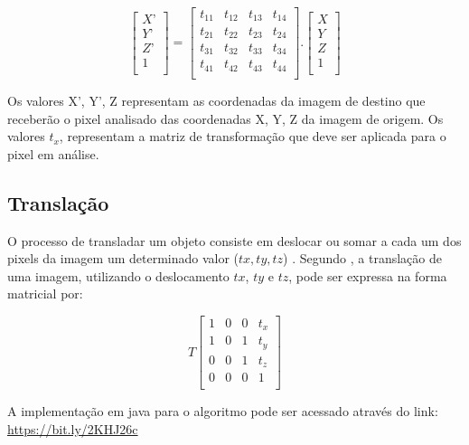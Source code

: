\documentclass[
	12pt,				%
	oneside,			%
	a4paper,			%
	english,			%
	french,				%
	spanish,			%
	brazil,				%
	]{abntex2}
\begin{document}
\[
\begin{bmatrix}
    X’       \\ 
	Y’       \\ 
	Z’       \\ 
    1        \\ 
\end{bmatrix}
=
\begin{bmatrix}
    t_{11} & t_{12} & t_{13} & t_{14}   \\ 
	t_{21} & t_{22} & t_{23} & t_{24}   \\ 
	t_{31} & t_{32} & t_{33} & t_{34}   \\ 
	t_{41} & t_{42} & t_{43} & t_{44}   \\ 
\end{bmatrix}
.
\begin{bmatrix}
    X       \\ 
	Y       \\ 
	Z       \\ 
    1       \\ 
\end{bmatrix}
\]

Os valores X’, Y’, Z representam as coordenadas da imagem de destino que receberão o pixel analisado das coordenadas X, Y, Z da imagem de origem. Os valores \(t_x\), representam a matriz de transformação que deve ser aplicada para o pixel em análise.

\subsection{Translação}

O processo de transladar um objeto consiste em deslocar ou somar a cada um dos pixels da imagem um determinado valor (\(tx, ty, tz\)) \cite{conciAzevedoLeta:2008}. Segundo \citet{pedriniSchwartz:2008}, a translação de uma imagem, utilizando o deslocamento \(tx\), \(ty\) e \(tz\), pode ser expressa na forma matricial por:

\[
T
\begin{bmatrix}
    1 & 0 & 0 & t_x   \\ 
    1 & 0 & 1 & t_y   \\    
    0 & 0 & 1 & t_z   \\    
    0 & 0 & 0 & 1   \\  
\end{bmatrix} 
\]

A implementação em java para o algoritmo pode ser acessado através do link: \url{https://bit.ly/2KHJ26c}
\end{document}
